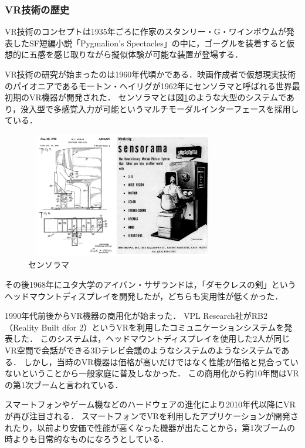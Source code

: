 \documentclass[12pt,a4j]{ltjsarticle}
\begin{document}
\subsubsection{VR技術の歴史}
VR技術のコンセプトは1935年ごろに作家のスタンリー・G・ワインボウムが発表したSF短編小説「Pygmalion’s Spectacles」の中に，ゴーグルを装着すると仮想的に五感を感じ取りながら擬似体験が可能な装置が登場する．

VR技術の研究が始まったのは1960年代頃かである．映画作成者で仮想現実技術のパイオニアであるモートン・ヘイリグが1962年にセンソラマと呼ばれる世界最初期のVR機器が開発された．
センソラマとは図\ref{fig:センソラマ.pdf}のような大型のシステムであり，没入型で多感覚入力が可能というマルチモーダルインターフェースを採用している．

\begin{figure}[h]
\begin{center}
 \includegraphics[clip,width=85mm,height=55mm]{センソラマ.pdf}
\end{center}
 \caption{センソラマ}
 \label{fig:センソラマ.pdf}
\end{figure}

その後1968年にユタ大学のアイバン・サザランドは，「ダモクレスの剣」というヘッドマウントディスプレイを開発したが，どちらも実用性が低くかった\cite{VRの概念の登場}．

1990年代前後からVR機器の商用化が始まった．
VPL Research社がRB2（Reality Built dfor 2）というVRを利用したコミュニケーションシステムを発表した．
このシステムは，ヘッドマウントディスプレイを使用した2人が同じVR空間で会話ができる3Dテレビ会議のようなシステムのようなシステムである．
しかし，当時のVR機器は価格が高いだけではなく性能が価格と見合っていないということから一般家庭に普及しなかった．
この商用化から約10年間はVRの第1次ブームと言われている\cite{VRの初の商用化}．

スマートフォンやゲーム機などのハードウェアの進化により2010年代以降にVRが再び注目される\cite{VRの概念の登場}．
スマートフォンでVRを利用したアプリケーションが開発されたり，以前より安価で性能が高くなった機器が出たことから，第1次ブームの時よりも日常的なものになろうとしている．
\end{document}
